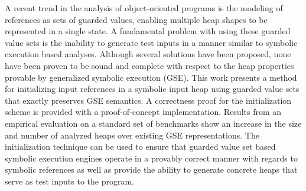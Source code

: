 A recent trend in the analysis of object-oriented programs is the
modeling of references as sets of guarded values, enabling multiple
heap shapes to be represented in a single state.  A fundamental
problem with using these guarded value sets is the inability to
generate test inputs in a manner similar to symbolic execution based
analyses.
Although several solutions have been proposed, none have been proven
to be sound and complete with respect to the heap properties provable
by generalized symbolic execution (GSE). This work presents a method for initializing input references
in a symbolic input heap using guarded value sets that exactly
preserves GSE semantics. A correctness proof for the initialization
scheme is provided with a proof-of-concept implementation. Results from an empirical evaluation on a standard set of \gsetxt{} benchmarks show an increase in the
size and number of analyzed heaps over existing GSE
representations. The initialization technique can be used to ensure
that guarded value set based symbolic execution engines operate in a
provably correct manner with regards to symbolic references as well as
provide the ability to generate concrete heaps that serve as test
inputs to the program.



